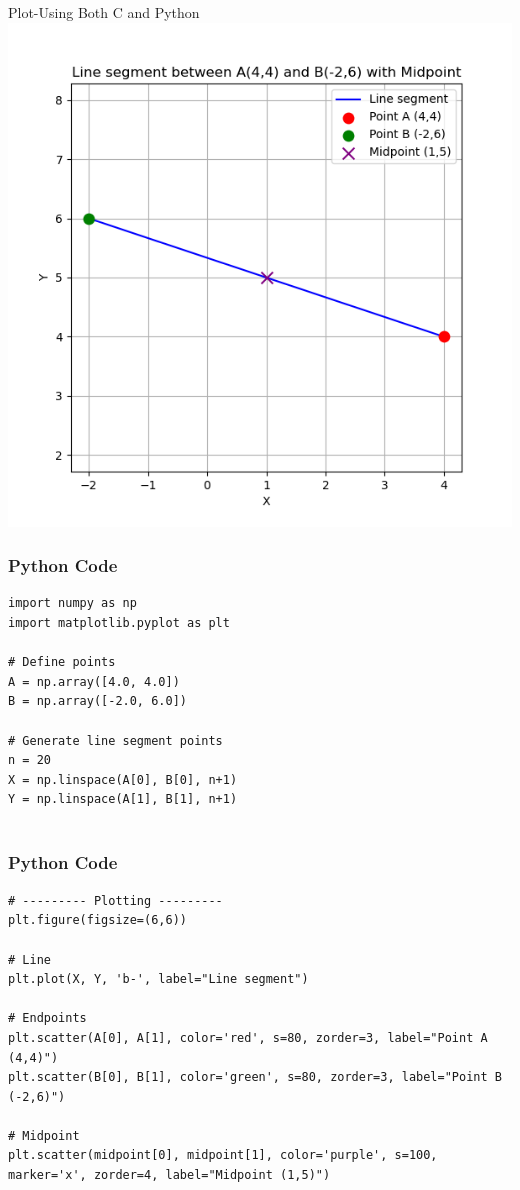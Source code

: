 \documentclass{beamer}
\begin{document}
\begin{frame}{Plot-Using Both C and Python}
    \centering
    \includegraphics[width=\columnwidth, height=0.8\textheight, keepaspectratio]{figs/line_segment.png}     
\end{frame}

\begin{frame}[fragile]
    \frametitle{Python Code}
    \begin{lstlisting}
import numpy as np
import matplotlib.pyplot as plt

# Define points
A = np.array([4.0, 4.0])
B = np.array([-2.0, 6.0])

# Generate line segment points
n = 20
X = np.linspace(A[0], B[0], n+1)
Y = np.linspace(A[1], B[1], n+1)


\end{lstlisting}
\end{frame}

\begin{frame}[fragile]
    \frametitle{Python Code }
    \begin{lstlisting}
# --------- Plotting ---------
plt.figure(figsize=(6,6))

# Line
plt.plot(X, Y, 'b-', label="Line segment")

# Endpoints
plt.scatter(A[0], A[1], color='red', s=80, zorder=3, label="Point A (4,4)")
plt.scatter(B[0], B[1], color='green', s=80, zorder=3, label="Point B (-2,6)")

# Midpoint
plt.scatter(midpoint[0], midpoint[1], color='purple', s=100, marker='x', zorder=4, label="Midpoint (1,5)")


\end{lstlisting}
\end{frame}
\end{document}
